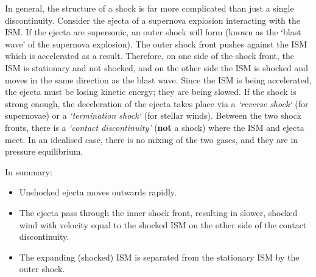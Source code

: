 %
\par 
In general, the structure of a shock is far more complicated than just a single discontinuity.
 Consider the ejecta of a supernova explosion interacting with the ISM.
 If the ejecta are supersonic, an outer shock will form (known as the `blast wave' of the supernova explosion).
 The outer shock front pushes against the ISM which is accelerated as a result.
 Therefore, on one side of the shock front, the ISM is stationary and not shocked, and on the other side the ISM is shocked and moves in the same direction as the blast wave.
 Since the ISM is being accelerated, the ejecta must be losing kinetic energy; they are being slowed.
 If the shock is strong enough, the deceleration of the ejecta takes place via a \emph{`reverse shock`} (for supernovae) or a \emph{`termination shock`} (for stellar winds).
 Between the two shock fronts, there is a \emph{`contact discontinuity'} (\textbf{not} a shock) where the ISM and ejecta meet.
 In an idealised case, there is no mixing of the two gases, and they are in pressure equilibrium.
\par 
In summary:
%
\begin{itemize}
	\item Unshocked ejecta moves outwards rapidly.
	\item The ejecta pass through the inner shock front, resulting in slower, shocked wind with velocity equal to the shocked ISM on the other side of the contact discontinuity.
	\item The expanding (shocked) ISM is separated from the stationary ISM by the outer shock.
\end{itemize}
%








